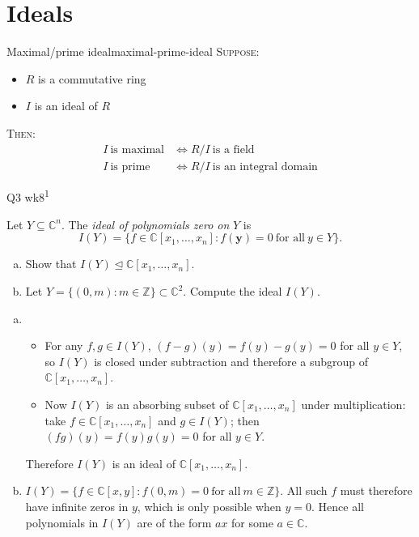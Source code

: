 \section{Ideals}

\begin{proposition}{Maximal/prime ideal}{maximal-prime-ideal}
    \textsc{Suppose}:
        \begin{itemize}
            \item $R$ is a commutative ring
            \item $I$ is an ideal of $R$
        \end{itemize}
    \textsc{Then}:
        \begin{align*}
            I \ \text{is maximal} &\iff R/I \ \text{is a field} \\
            I \ \text{is prime}   &\iff R/I \ \text{is an integral domain}            
        \end{align*}
\end{proposition}

\begin{problem}{Q3 wk8\textsuperscript{1}}{}    


    Let $Y \subseteq \mathbb{C}^n$. The \textit{ideal of polynomials zero on} $Y$ is
        $$ I(Y) = \{ f \in \mathbb{C}[x_1, \ldots, x_n] : f(\mathbf{y}) = 0 \ \text{for all} \ y \in Y \} . $$
    \begin{enumerate}[a)]
        \item Show that $I(Y) \trianglelefteq \mathbb{C}[x_1, \ldots, x_n]$.
        \item Let $Y = \{ (0, m) : m \in \mathbb{Z} \} \subset \mathbb{C}^2$. Compute the ideal $I(Y)$.
    \end{enumerate}

    \tcblower

    \begin{enumerate}[a)]
        \item
            \begin{itemize}
                \item For any $f, g \in I(Y)$, $(f - g)(y) = f(y) - g(y) = 0$ for all $y \in Y$, so $I(Y)$ is closed under subtraction and therefore a subgroup of $\mathbb{C}[x_1, \ldots, x_n]$.
                \item Now $I(Y)$ is an absorbing subset of $\mathbb{C}[x_1, \ldots, x_n]$ under multiplication: take $f \in \mathbb{C}[x_1, \ldots, x_n]$ and $g \in I(Y)$; then $(fg)(y) = f(y) g(y) = 0$ for all $y \in Y$.
            \end{itemize}
            Therefore $I(Y)$ is an ideal of $\mathbb{C}[x_1, \ldots, x_n]$.
        \item $I(Y) = \{ f \in \mathbb{C}[x, y] : f(0, m) = 0 \ \text{for all} \ m \in \mathbb{Z} \}$. All such $f$ must therefore have infinite zeros in $y$, which is only possible when $y = 0$. Hence all polynomials in $I(Y)$ are of the form $ax$ for some $a \in \mathbb{C}$.
    \end{enumerate}

\end{problem}

